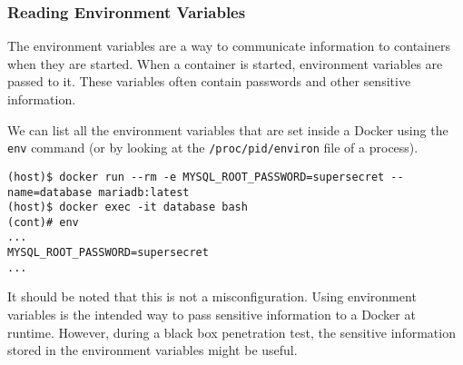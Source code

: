 \subsubsection{Reading Environment Variables}\label{pentest:container:env-vars}
The environment variables are a way to communicate information to containers when they are started. When a container is started, environment variables are passed to it. These variables often contain passwords and other sensitive information.

\medskip

We can list all the environment variables that are set inside a Docker using the \lstinline{env} command (or by looking at the \lstinline{/proc/pid/environ} file of a process).

\begin{lstlisting}[caption={Listing all environment variables in a container}, captionpos=b]
(host)$ docker run --rm -e MYSQL_ROOT_PASSWORD=supersecret --name=database mariadb:latest
(host)$ docker exec -it database bash
(cont)# env
...
MYSQL_ROOT_PASSWORD=supersecret
...
\end{lstlisting}

It should be noted that this is not a misconfiguration. Using environment variables is the intended way to pass sensitive information to a Docker at runtime. However, during a black box penetration test, the sensitive information stored in the environment variables might be useful.

